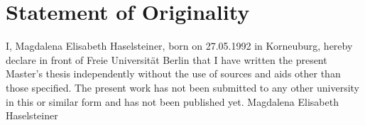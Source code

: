 \section*{Statement of Originality}
\hfill \break
\hfill \break

I, Magdalena Elisabeth Haselsteiner, born on 27.05.1992 in Korneuburg, hereby declare in front of Freie Universität Berlin that I have written the present Master's thesis independently without the use of sources and aids other than those specified. The present work has not been submitted to any other university in this or similar form and has not been published yet.\hfill \break
\hfill \break
\hfill \break
\hfill \break
\hfill \break
\hfill \break
Magdalena Elisabeth Haselsteiner
